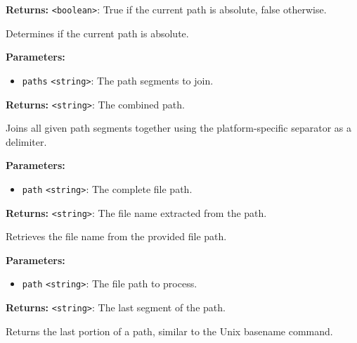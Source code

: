 \documentclass[12pt,a4paper]{article}
\begin{document}
\noindent \textbf{Returns:} \texttt{<boolean>}: True if the current path is absolute, false otherwise.

\noindent Determines if the current path is absolute.

\vspace{5mm}
\noindent {}


\noindent \textbf{Parameters:}
\begin{itemize}
  \item \texttt{paths} \texttt{<string>}: The path segments to join.
\end{itemize}

\noindent \textbf{Returns:} \texttt{<string>}: The combined path.

\noindent Joins all given path segments together using the platform-specific separator as a delimiter.

\vspace{5mm}
\noindent {}


\noindent \textbf{Parameters:}
\begin{itemize}
  \item \texttt{path} \texttt{<string>}: The complete file path.
\end{itemize}

\noindent \textbf{Returns:} \texttt{<string>}: The file name extracted from the path.

\noindent Retrieves the file name from the provided file path.

\vspace{5mm}
\noindent {}


\noindent \textbf{Parameters:}
\begin{itemize}
  \item \texttt{path} \texttt{<string>}: The file path to process.
\end{itemize}

\noindent \textbf{Returns:} \texttt{<string>}: The last segment of the path.

\noindent Returns the last portion of a path, similar to the Unix \textasciigrave{}basename\textasciigrave{} command.
\end{document}
